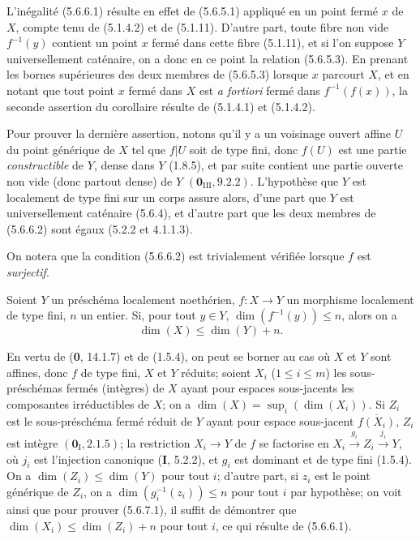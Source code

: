 L'inégalité (5.6.6.1) résulte en effet de (5.6.5.1) appliqué en un point
fermé $x$ de $X$, compte tenu de (5.1.4.2) et de (5.1.11). D'autre part,
toute fibre non vide $f^{-1}(y)$ contient un point $x$ fermé dans cette
fibre (5.1.11), et si l'on suppose $Y$ universellement caténaire, on a donc
en ce point la relation (5.6.5.3). En prenant les bornes supérieures des deux
membres de (5.6.5.3) lorsque $x$ parcourt $X$, et en notant que tout point
$x$ fermé dans $X$ est \emph{a fortiori} fermé dans $f^{-1}(f(x))$, la
seconde assertion du corollaire résulte de (5.1.4.1) et (5.1.4.2).

Pour prouver la dernière assertion, notons qu'il y a un voisinage ouvert
affine $U$ du point générique de $X$ tel que $f|U$ soit de type fini, donc
$f(U)$ est une partie \emph{constructible} de $Y$, dense dans $Y$ (1.8.5), et par
suite contient une partie ouverte non vide (donc partout dense) de $Y$
$(\mathbf{0}_{\mathrm{III}},9.2.2)$. L'hypothèse que $Y$ est localement de type fini
sur un corps assure alors, d'une part que $Y$ est universellement caténaire
(5.6.4), et d'autre part que les deux membres de (5.6.6.2) sont égaux
(5.2.2 et 4.1.1.3).

On notera que la condition (5.6.6.2) est trivialement vérifiée lorsque $f$
est \emph{surjectif}.

\begin{corollary}[5.6.7]
\label{IV.2.s5.6.7-fr}
Soient $Y$ un préschéma localement noethérien, $f:X\to Y$ un morphisme
localement de type fini, $n$ un entier. Si, pour tout $y\in Y$,
$\dim(f^{-1}(y))\leq n$, alors on a
\begin{equation}
\dim(X)\leq\dim(Y)+n.
\tag{5.6.7.1}\label{IV.2.s5.6.7.1-fr}
\end{equation}
\end{corollary}

En vertu de (\textbf{0}, 14.1.7) et de (1.5.4), on peut se borner au cas où $X$ et
$Y$ sont affines, donc $f$ de type fini, $X$ et $Y$ réduits; soient $X_i$
($1\leq i\leq m$) les sous-préschémas fermés (intègres) de $X$ ayant pour
espaces sous-jacents les composantes irréductibles de $X$; on a
$\dim(X)=\sup_i(\dim(X_i))$. Si $Z_i$ est le sous-préschéma fermé réduit de
$Y$ ayant pour espace sous-jacent $\overline{f(X_i)}$, $Z_i$ est intègre
$(\mathbf{0}_{\mathrm I},2.1.5)$; la restriction $X_i\to Y$ de $f$ se factorise en
$X_i\xrightarrow{g_i}Z_i\xrightarrow{j_i}Y$, où $j_i$ est l'injection
canonique (\textbf{I}, 5.2.2), et $g_i$ est dominant
et de type fini (1.5.4).
On a $\dim(Z_i)\leq\dim(Y)$ pour tout $i$; d'autre part, si $z_i$ est le
point générique de $Z_i$, on a $\dim(g_i^{-1}(z_i))\leq n$ pour tout $i$
par hypothèse; on voit ainsi que pour prouver (5.6.7.1), il suffit de
démontrer que $\dim(X_i)\leq\dim(Z_i)+n$ pour tout $i$, ce qui résulte de
(5.6.6.1).

